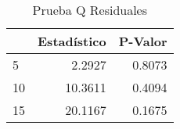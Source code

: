 \begin{table}[H]
\label{tab:q_test_resid}
\centering
\begin{tabular}{lrr}
\toprule
 & Estad\'istico & P-Valor \\
\midrule
5 & 2.2927 & 0.8073 \\
10 & 10.3611 & 0.4094 \\
15 & 20.1167 & 0.1675 \\
\bottomrule
\end{tabular}
\caption{Prueba Q Residuales}
\end{table}
